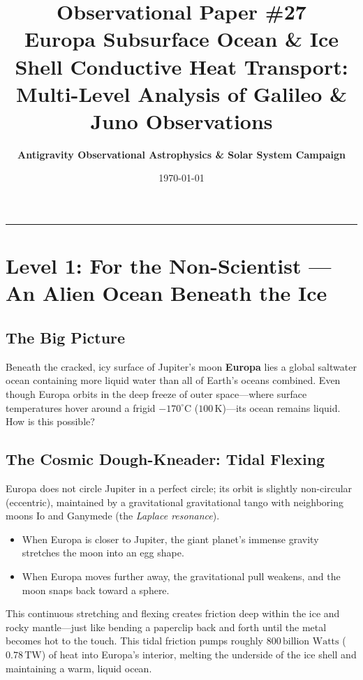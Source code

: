 \documentclass[11pt,a4paper]{article}
\title{\Huge \textbf{Observational Paper \#27}\\ \Large Europa Subsurface Ocean \& Ice Shell Conductive Heat Transport: Multi-Level Analysis of Galileo \& Juno Observations}
\author{\textbf{Antigravity Observational Astrophysics \& Solar System Campaign}}
\date{\today}
\begin{document}
\maketitle

\vspace{-1em}
\begin{center}
\rule{\textwidth}{1.5pt}
\end{center}

\section*{Level 1: For the Non-Scientist — An Alien Ocean Beneath the Ice}

\subsection*{The Big Picture}
Beneath the cracked, icy surface of Jupiter's moon \textbf{Europa} lies a global saltwater ocean containing more liquid water than all of Earth's oceans combined. Even though Europa orbits in the deep freeze of outer space—where surface temperatures hover around a frigid $-170^\circ\text{C}$ ($100\,\text{K}$)—its ocean remains liquid. How is this possible?

\subsection*{The Cosmic Dough-Kneader: Tidal Flexing}
Europa does not circle Jupiter in a perfect circle; its orbit is slightly non-circular (eccentric), maintained by a gravitational gravitational tango with neighboring moons Io and Ganymede (the \textit{Laplace resonance}).
\begin{itemize}
    \item When Europa is closer to Jupiter, the giant planet's immense gravity stretches the moon into an egg shape.
    \item When Europa moves further away, the gravitational pull weakens, and the moon snaps back toward a sphere.
\end{itemize}
This continuous stretching and flexing creates friction deep within the ice and rocky mantle—just like bending a paperclip back and forth until the metal becomes hot to the touch. This tidal friction pumps roughly $800\,\text{billion Watts}$ ($0.78\,\text{TW}$) of heat into Europa's interior, melting the underside of the ice shell and maintaining a warm, liquid ocean.
\end{document}
